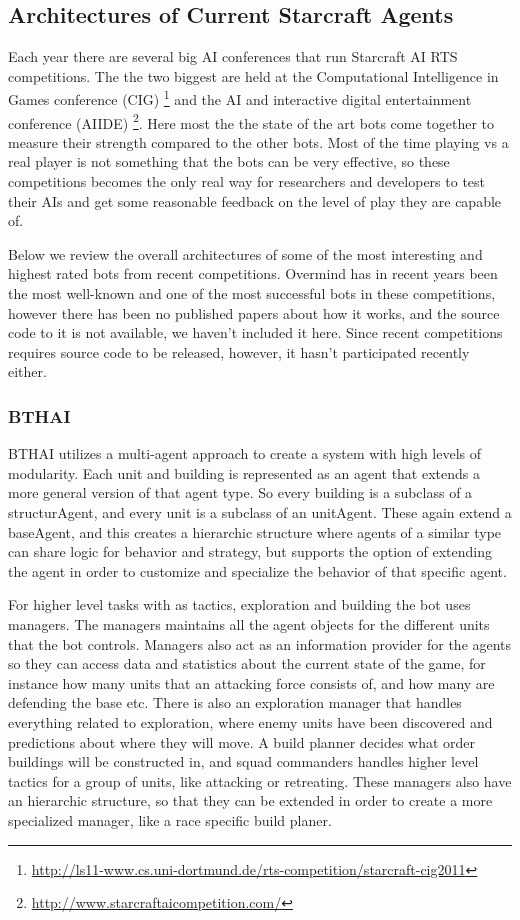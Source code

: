 \subsection{Architectures of Current Starcraft Agents}
Each year there are several big AI conferences that run Starcraft AI RTS
competitions. The the two biggest are held at the Computational Intelligence in
Games conference (CIG) \footnote{\url{
http://ls11-www.cs.uni-dortmund.de/rts-competition/starcraft-cig2011}} and the
AI and interactive digital entertainment conference (AIIDE)
\footnote{\url{http://www.starcraftaicompetition.com/}}. Here most the the state
of the art bots come together to measure their strength compared to the other
bots. Most of the time playing vs a real player is not something that the bots
can be very effective, so these competitions becomes the only real way for
researchers and developers to test their AIs and get some reasonable feedback on
the level of play they are capable of.

Below we review the overall architectures of some of the most interesting and
highest rated bots from recent competitions. Overmind has in recent years been
the most well-known and one of the most successful bots in these competitions,
however there has been no published papers about how it works, and the source
code to it is not available, we haven't included it here. Since recent
competitions requires source code to be released, however, it hasn't
participated recently either.


\subsubsection{BTHAI}
BTHAI utilizes a multi-agent approach to create a system with high levels of
modularity. Each unit and building is represented as an agent that extends a
more general version of that agent type. So every building is a subclass of a
structurAgent, and every unit is a subclass of an unitAgent. These again extend
a baseAgent, and this creates a hierarchic structure where agents of a similar
type can share logic for behavior and strategy, but supports the option of
extending the agent in order to customize and specialize the behavior of that
specific agent. 

For higher level tasks with as tactics, exploration and building the bot uses
managers. The managers maintains all the agent objects for the different units
that the bot controls. Managers also act as an information provider for the
agents so they can access data and statistics about the current state of the
game, for instance how many units that an attacking force consists of, and how
many are defending the base etc. There is also an exploration manager that
handles everything related to exploration, where enemy units have been
discovered and predictions about where they will move. A build planner decides
what order buildings will be constructed in, and squad commanders handles higher
level tactics for a group of units, like attacking or retreating. These managers
also have an hierarchic structure, so that they can be extended in order to
create a more specialized manager, like a race specific build planer. 

